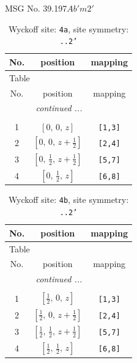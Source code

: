 \documentclass[fleqn,8pt]{jsarticle}
\begin{document}
\setcounter{MaxMatrixCols}{32}

\renewcommand{\tablename}{Table~}
\renewcommand{\figurename}{Figure~}
\begin{center}
\LARGE
MSG No. 39.197\quad$Ab'm2'$
\end{center}
\renewcommand{\arraystretch}{1.2}
\begin{longtable}{ccc}
\caption{Wyckoff site: {\tt 4a}, site symmetry: {\tt ..2'}}
 \\
 \hline \hline
No. & position & mapping \\ \hline \endfirsthead

\multicolumn{2}{l}{\tablename\ \thetable{}} \\
 \hline \hline
No. & position & mapping \\ \hline \endhead

 \hline \hline
\multicolumn{2}{r}{\footnotesize\it continued ...} \\ \endfoot

 \hline \hline
\multicolumn{2}{r}{} \\ \endlastfoot

1 & $\left[ 0,\, 0,\, z \right]$ & {\tt [1,3]} \\ \hline
2 & $\left[ 0,\, 0,\, z + \frac{1}{2} \right]$ & {\tt [2,4]} \\ \hline
3 & $\left[ 0,\, \frac{1}{2},\, z + \frac{1}{2} \right]$ & {\tt [5,7]} \\ \hline
4 & $\left[ 0,\, \frac{1}{2},\, z \right]$ & {\tt [6,8]} \\
\end{longtable}
\renewcommand{\arraystretch}{1.2}
\begin{longtable}{ccc}
\caption{Wyckoff site: {\tt 4b}, site symmetry: {\tt ..2'}}
 \\
 \hline \hline
No. & position & mapping \\ \hline \endfirsthead

\multicolumn{2}{l}{\tablename\ \thetable{}} \\
 \hline \hline
No. & position & mapping \\ \hline \endhead

 \hline \hline
\multicolumn{2}{r}{\footnotesize\it continued ...} \\ \endfoot

 \hline \hline
\multicolumn{2}{r}{} \\ \endlastfoot

1 & $\left[ \frac{1}{2},\, 0,\, z \right]$ & {\tt [1,3]} \\ \hline
2 & $\left[ \frac{1}{2},\, 0,\, z + \frac{1}{2} \right]$ & {\tt [2,4]} \\ \hline
3 & $\left[ \frac{1}{2},\, \frac{1}{2},\, z + \frac{1}{2} \right]$ & {\tt [5,7]} \\ \hline
4 & $\left[ \frac{1}{2},\, \frac{1}{2},\, z \right]$ & {\tt [6,8]} \\
\end{longtable}
\end{document}
